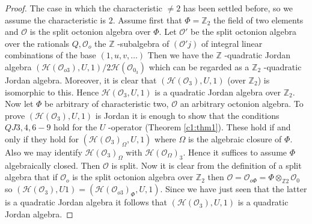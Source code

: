 \begin{proof}
The case in which the characteristic $\neq 2$ has been settled before,
so we assume the characteristic is $2$. Assume first that
$\Phi=\mathbb{Z}_2$ the field of two elements and $\mathcal{O}$ is the
split octonion algebra over $\Phi$. Let $\mathcal{O}'$ be the split
octonion algebra over the rationals $Q,\mathcal{O}_o$ the $\mathbb{Z}$
-subalgebra of $(\mathcal{O}'j)$ of integral linear combinations of
the base $(1,u,v,\ldots)$ Then we have the $\mathbb{Z}$ -quadratic
Jordan algebra $(\mathscr{H}(\mathcal{O}_{o3}),
U,1)/2\mathscr{H}(\mathcal{O}_{0_3})$ which can be regarded as a
$\mathbb{Z}_2$ -quadratic Jordan algebra. Moreover, it is clear that
$(\mathscr{H}(\mathcal{O}_3),U,1)$ (over $\mathbb{Z}_2$) is isomorphic
to this. Hence $\mathscr{H}(\mathcal{O}_3,U,1)$ is a quadratic Jordan
algebra over $\mathbb{Z}_2$. Now let $\Phi$ be arbitrary of
characteristic two, $\mathcal{O}$ an arbitrary octonion algebra. To
prove $(\mathscr{H}(\mathcal{O}_3),U,1)$ is Jordan it is enough to
show that the conditions $QJ 3,4, 6 - 9$ hold for the $U$ -operator
(Theorem \ref{c1:thm1}). These hold if and only if they hold for
$(\mathscr{H}(\mathcal{O}_3)_{\Omega},U,1)$ where $\Omega$ is the
algebraic closure of $\Phi$. Also we may identify
$\mathscr{H}(\mathcal{O}_3)_{\Omega}$ with
$\mathscr{H}(\mathcal{O}_{\Omega})_3$. Hence it suffices to assume
$\Phi$ algebraically closed. Then $\mathcal{O}$ is split. Now it is
clear from the definition of  a split algebra that if $\mathcal{O}_o$
is the split octonion algebra over $\mathbb{Z}_2$ then
$\mathcal{O}=\mathcal{O}_{o\Phi}=\Phi\otimes_{\mathbb{Z}2}\mathcal{O}_0$
so
$(\mathscr{H}(\mathcal{O}_3),U1)=(\mathscr{H}(\mathcal{O}_{o3})_{\Phi},U,1)$. Since 
we have just seen that the latter is a quadratic Jordan algebra it
follows that $(\mathscr{H}(\mathcal{O}_3),U,1)$ is a quadratic Jordan
algebra. 


\end{proof}
